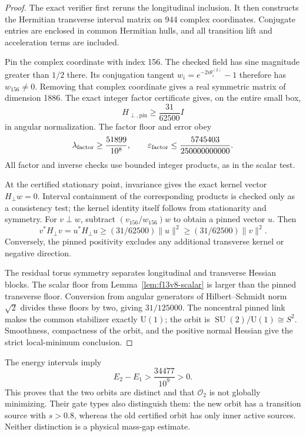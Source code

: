 \documentclass[11pt,oneside]{article}
\DeclareMathOperator{\SU}{SU}
\begin{document}
\begin{proof}
The exact verifier
first reruns the longitudinal inclusion.
It then constructs the Hermitian transverse
interval matrix on 944 complex coordinates.
Conjugate entries are enclosed in common
Hermitian hulls, and all transition lift
and acceleration terms are included.

Pin the complex coordinate with index
156. The checked field has sine magnitude
greater than \(1/2\) there. Its conjugation
tangent
\(w_i=e^{-2i\theta_i^{(2)}}-1\) therefore
has \(w_{156}\ne0\). Removing that complex
coordinate gives a real symmetric matrix
of dimension 1886. The exact integer
factor certificate gives, on the entire
small box,
\[
 H_{\perp,\mathrm{pin}}\ge
       \frac{31}{62500}I
\]
in angular normalization. The factor
floor and error obey
\[
 \lambda_{\rm factor}\ge\frac{51899}{10^8},
 \qquad
 \varepsilon_{\rm factor}\le\frac{5745403}{250000000000}.
\]
All factor and inverse checks use bounded
integer products, as in the scalar test.

At the certified stationary point,
invariance gives the exact kernel vector
\(H_\perp w=0\). Interval containment of
the corresponding products is checked
only as a consistency test; the kernel
identity itself follows from stationarity
and symmetry. For \(v\perp w\), subtract
\((v_{156}/w_{156})w\) to obtain a pinned
vector \(u\). Then
\[
 v^*H_\perp v=u^*H_\perp u
 \ge(31/62500)\|u\|^2
 \ge(31/62500)\|v\|^2 .
\]
Conversely, the pinned positivity excludes
any additional transverse kernel or
negative direction.

The residual torus symmetry separates
longitudinal and transverse Hessian
blocks. The scalar floor from
Lemma~\ref{lem:f13v8-scalar} is larger
than the pinned transverse floor.
Conversion from angular generators of
Hilbert--Schmidt norm \(\sqrt2\) divides
these floors by two, giving \(31/125000\).
The noncentral pinned link makes the
common stabilizer exactly \(\mathrm U(1)\);
the orbit is \(\SU(2)/\mathrm U(1)\cong S^2\).
Smoothness, compactness of the orbit, and
the positive normal Hessian give the
strict local-minimum conclusion.
\end{proof}

The energy intervals imply
\[
 E_2-E_1>\frac{34477}{10^9}>0.
\]
This proves that the two orbits are
distinct and that \(\mathcal O_2\) is
not globally minimizing. Their gate
types also distinguish them: the new
orbit has a transition source with
\(s>0.8\), whereas the old certified
orbit has only inner active sources.
Neither distinction is a physical
mass-gap estimate.
\end{document}
